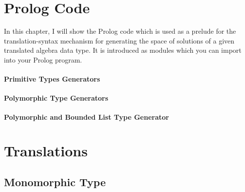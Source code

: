 \chapter{Prolog Code}
In this chapter, I will show the Prolog code which is used as a prelude for the translation-syntax mechanism for generating the space of solutions of a given translated algebra data type. It is introduced as modules which you can import into your Prolog program.
\subsubsection*{Primitive Types Generators}

\subsubsection*{Polymorphic Type Generators}

\subsubsection*{Polymorphic and Bounded List Type Generator}

\chapter{Translations}
\section{Monomorphic Type}
